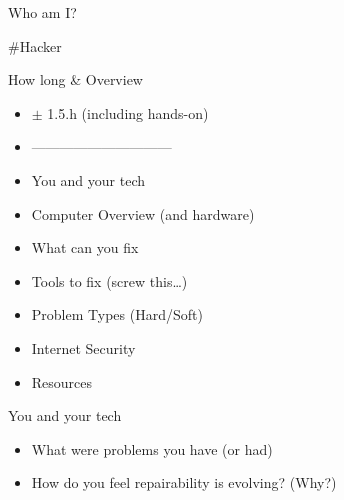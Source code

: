 

\begin{frame}[t,plain]
\titlepage
\end{frame}



\begin{frame}[t,fragile]{Who am I?}
\centerline {\#Hacker}
\end{frame}

\begin{frame}[t,fragile]{How long \& Overview}
\begin{itemize}
\item $\pm$ 1.5.h (including hands-on)
\item ------------------------------
\item You and your tech
\item Computer Overview (and hardware)
\item What can you fix
\item Tools to fix (screw this\ldots)
\item Problem Types (Hard/Soft)
\item Internet Security
\item Resources
\end{itemize}
\end{frame}


\begin{frame}[t,fragile]{You and your tech}
\begin{itemize}
\item What were problems you have (or had)
\item How do you feel repairability is evolving? (Why?)
\end{itemize}
\end{frame}

